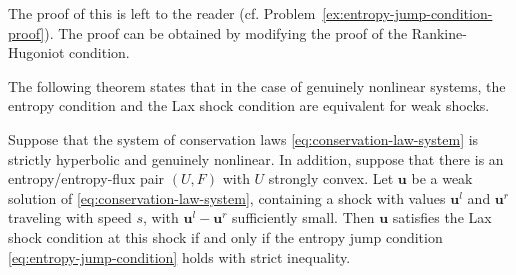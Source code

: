 The proof of this is left to the reader (cf. Problem~\ref{ex:entropy-jump-condition-proof}). The proof can be obtained by modifying the proof of the Rankine-Hugoniot condition.

The following theorem states that in the case of genuinely nonlinear systems, the entropy condition and the Lax shock condition are equivalent for weak shocks.

\begin{Theorem}
\label{thm:entropy-lax-small-shock-equivalence}
Suppose that the system of conservation laws \eqref{eq:conservation-law-system} is strictly hyperbolic and genuinely nonlinear. In addition, suppose that there is an entropy/entropy-flux pair $(U,F)$ with $U$ strongly convex. Let $\bm{u}$ be a weak solution of \eqref{eq:conservation-law-system}, containing a shock with values $\bm{u}^l$ and $\bm{u}^r$ traveling with speed $s$, with $\bm{u}^l-\bm{u}^r$ sufficiently small. Then $\bm{u}$ satisfies the Lax shock condition at this shock if and only if the entropy jump condition \eqref{eq:entropy-jump-condition} holds with strict inequality.
\end{Theorem}

